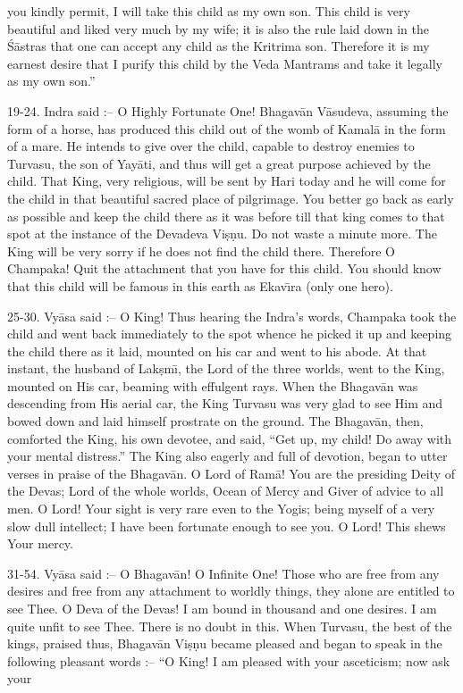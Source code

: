 you kindly permit, I will take this child as my own son. This child is very beautiful and liked very much by my wife; it is also the rule laid down in the \'S\=astras that one can accept any child as the Kritrima son. Therefore it is my earnest desire that I purify this child by the Veda Mantrams and take it legally as my own son.''

19-24. Indra said :-- O Highly Fortunate One! Bhagav\=an V\=asudeva, assuming the form of a horse, has produced this child out of the womb of Kamal\=a in the form of a mare. He intends to give over the child, capable to destroy enemies to Turvasu, the son of Yay\=ati, and thus will get a great purpose achieved by the child. That King, very religious, will be sent by Hari today and he will come for the child in that beautiful sacred place of pilgrimage. You better go back as early as possible and keep the child there as it was before till that king comes to that spot at the instance of the Devadeva Vi\d{s}\d{n}u. Do not waste a minute more. The King will be very sorry if he does not find the child there. Therefore O Champaka! Quit the attachment that you have for this child. You should know that this child will be famous in this earth as Ekav\={\i}ra (only one hero).

25-30. Vy\=asa said :-- O King! Thus hearing the Indra's words, Champaka took the child and went back immediately to the spot whence he picked it up and keeping the child there as it laid, mounted on his car and went to his abode. At that instant, the husband of Lak\d{s}m\={\i}, the Lord of the three worlds, went to the King, mounted on His car, beaming with effulgent rays. When the Bhagav\=an was descending from His aerial car, the King Turvasu was very glad to see Him and bowed down and laid himself prostrate on the ground. The Bhagav\=an, then, comforted the King, his own devotee, and said, ``Get up, my child! Do away with your mental distress.'' The King also eagerly and full of devotion, began to utter verses in praise of the Bhagav\=an. O Lord of Ram\=a! You are the presiding Deity of the Devas; Lord of the whole worlds, Ocean of Mercy and Giver of advice to all men. O Lord! Your sight is very rare even to the Yogis; being myself of a very slow dull intellect; I have been fortunate enough to see you. O Lord! This shews Your mercy.

31-54. Vy\=asa said :-- O Bhagav\=an! O Infinite One! Those who are free from any desires and free from any attachment to worldly things, they alone are entitled to see Thee. O Deva of the Devas! I am bound in thousand and one desires. I am quite unfit to see Thee. There is no doubt in this. When Turvasu, the best of the kings, praised thus, Bhagav\=an Vi\d{s}\d{n}u became pleased and began to speak in the following pleasant words :-- ``O King! I am pleased with your asceticism; now ask your

